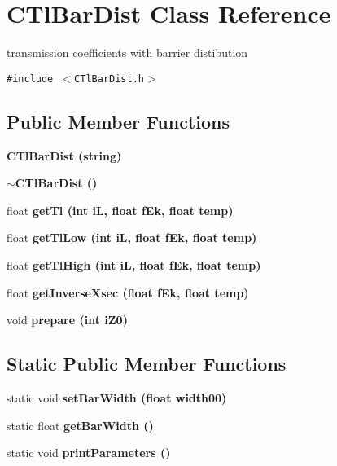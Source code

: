\section{CTl\-Bar\-Dist Class Reference}
\label{classCTlBarDist}
transmission coefficients with barrier distibution  


{\tt \#include $<$CTl\-Bar\-Dist.h$>$}

\subsection*{Public Member Functions}
\begin{CompactItemize}
\item 
\bf{CTl\-Bar\-Dist} (string)
\item 
\bf{$\sim$CTl\-Bar\-Dist} ()
\item 
float \bf{get\-Tl} (int i\-L, float f\-Ek, float temp)
\item 
float \bf{get\-Tl\-Low} (int i\-L, float f\-Ek, float temp)
\item 
float \bf{get\-Tl\-High} (int i\-L, float f\-Ek, float temp)
\item 
float \bf{get\-Inverse\-Xsec} (float f\-Ek, float temp)
\item 
void \bf{prepare} (int i\-Z0)
\end{CompactItemize}
\subsection*{Static Public Member Functions}
\begin{CompactItemize}
\item 
static void \bf{set\-Bar\-Width} (float width00)
\item 
static float \bf{get\-Bar\-Width} ()
\item 
static void \bf{print\-Parameters} ()
\end{CompactItemize}
